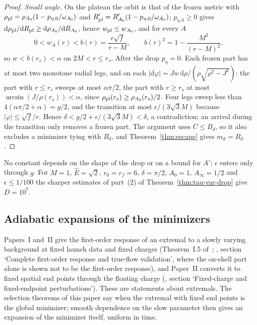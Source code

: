 \documentclass[aip,jmp,amsmath,amssymb,reprint]{revtex4-2}
\newcommand{\Ehat}{\hat E}
\newcommand{\dd}{\mathrm{d}}
\theoremstyle{plain}
\theoremstyle{definition}
\begin{document}
\begin{proof}
\emph{Small angle.} On the plateau the orbit is that of the frozen metric with
$\rho_{\rm pl}=\rho_{A_0}(1-p_{\eta,0}/\omega_{A_0})$ and $R_{\rm pl}'=R_{A_0}'(1-p_{\eta,0}/\omega_{A_0})$; $p_{\eta,0}\ge0$ gives
$\dd\rho_{\rm pl}/\dd R_{\rm pl}\ge\dd\rho_{A_0}/\dd R_{A_0}$, hence $w_{\rm pl}\le w_{A_0}$, and for every $A$
\[
  0<w_A(r)<b(r)=\frac{r\sqrt f}{r-M},\qquad b(r)^2=1-\frac{M^2}{(r-M)^2},
\]
so $w<b(r_s)<\alpha$ on $2M<r\le r_s$. After the drop $p_\eta=0$. Each frozen part has at most two monotone radial
legs, and on each $|\dd\varphi|=Jw\,\dd\rho/(\rho\sqrt{\rho^2-J^2})$: the part with $r\le r_s$ sweeps at most
$\alpha\pi/2$, the part with $r\ge r_s$ at most $\arcsin(J/\rho(r_s))<\alpha$, since $\rho_{\rm pl}(r_s)\ge\rho_{A_0}(r_s)/2$.
Four legs sweep less than $4(\alpha\pi/2+\alpha)=g/2$, and the transition at most $\epsilon/(3\sqrt3M)$ because
$|\dot\varphi|\le\sqrt f/r$. Hence $\delta<g/2+\epsilon/(3\sqrt3M)<\delta$, a contradiction; an arrival during the
transition only removes a frozen part. The argument uses $C\le B_d$, so it also excludes a minimizer
tying with $B_d$, and Theorem~\ref{thm:escape} gives $m_d=B_d$.
\end{proof}

No constant depends on the shape of the drop or on a bound for $A'$; $\epsilon$ enters only through $g$. For
$M=1$, $\Ehat=\sqrt2$, $r_0=r_f=6$, $\delta=\pi/2$, $A_0=1$, $A_\infty=1/2$ and $\epsilon\le1/100$ the sharper estimates of
part~(2) of Theorem~\ref{thm:tau-var-drop} give $D=10^7$.

\subsection{Adiabatic expansions of the minimizers}
\label{sec:adiabatic-min}
Papers~I and~II give the first-order response of an extremal to a slowly varying background at
fixed launch data and fixed charges (Theorem~I.5 of~\cite{PaperOne}; \cite{PaperTwo}, section
`Complete first-order response and true-flow validation', where the on-shell part alone is shown
not to be the first-order response), and Paper~II converts it to fixed spatial end points through
the floating charge (\cite{PaperTwo}, section `Fixed-charge and fixed-endpoint perturbations').
These are statements about extremals. The selection theorems of this paper say when the extremal
with fixed end points is the global minimizer; smooth dependence on the slow parameter then gives
an expansion of the minimizer itself, uniform in time.
\end{document}
